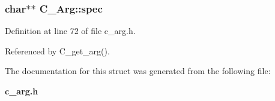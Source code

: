 \subsubsection{\setlength{\rightskip}{0pt plus 5cm}char$\ast$$\ast$ \bf{C\_\-Arg::spec}}\label{structC__Arg_33bd62c9f84c423391d6c34ff73666db}




Definition at line 72 of file c\_\-arg.h.

Referenced by C\_\-get\_\-arg().

The documentation for this struct was generated from the following file:\begin{CompactItemize}
\item 
\bf{c\_\-arg.h}\end{CompactItemize}

